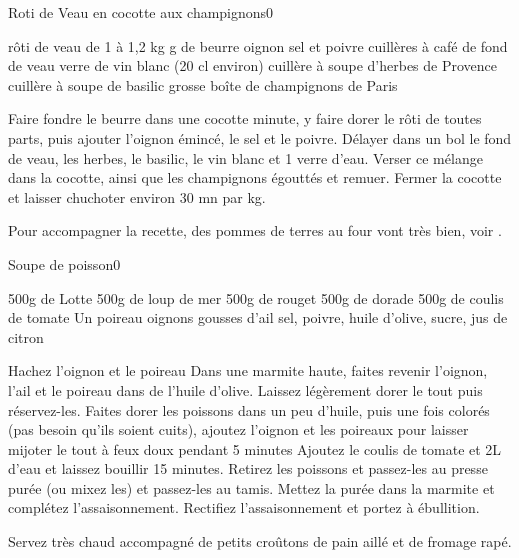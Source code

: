 \begin{recette}{Roti de Veau en cocotte aux champignons}{0}{}{}
\begin{ingredients}
 rôti de veau de 1 à 1,2 kg
 g de beurre
 oignon
\ingredient sel et poivre
 cuillères à café de fond de veau
 verre de vin blanc (20 cl environ)
 cuillère à soupe d'herbes de Provence
 cuillère à soupe de basilic
 grosse boîte de champignons de Paris
\end{ingredients}

\begin{preparation}
\etape Faire fondre le beurre dans une cocotte minute, y faire dorer le rôti de toutes parts, puis ajouter l'oignon émincé, le sel et le poivre.
\etape Délayer dans un bol le fond de veau, les herbes, le basilic, le vin blanc et 1 verre d'eau. Verser ce mélange dans la cocotte, ainsi que les champignons égouttés et remuer.
\etape Fermer la cocotte et laisser chuchoter environ 30 mn par kg.
\end{preparation}

\begin{remarque}
Pour accompagner la recette, des pommes de terres au four vont très bien, voir .
\end{remarque}
\end{recette}

\begin{recette}{Soupe de poisson}{0}{}{}
\begin{ingredients}
\ingredient 500g de Lotte
\ingredient 500g de loup de mer
\ingredient 500g de rouget
\ingredient 500g de dorade
\ingredient 500g de coulis de tomate
\ingredient Un poireau
 oignons
 gousses d'ail
\ingredient sel, poivre, huile d'olive, sucre, jus de citron
\end{ingredients}

\begin{preparation}
\etape Hachez l'oignon et le poireau
\etape Dans une marmite haute, faites revenir l'oignon, l'ail et le poireau dans de l'huile d'olive. Laissez légèrement dorer le tout puis réservez-les.
\etape Faites dorer les poissons dans un peu d'huile, puis une fois colorés (pas besoin qu'ils soient cuits), ajoutez l'oignon et les poireaux pour laisser mijoter le tout à feux doux pendant 5 minutes
\etape Ajoutez le coulis de tomate et 2L d'eau et laissez bouillir 15 minutes. 
\etape Retirez les poissons et passez-les au presse purée (ou mixez les) et passez-les au tamis.
\etape Mettez la purée dans la marmite et complétez l'assaisonnement. 
\etape Rectifiez l'assaisonnement et portez à ébullition.
\end{preparation}

Servez très chaud accompagné de petits croûtons de pain aillé et de fromage rapé.
\end{recette}

